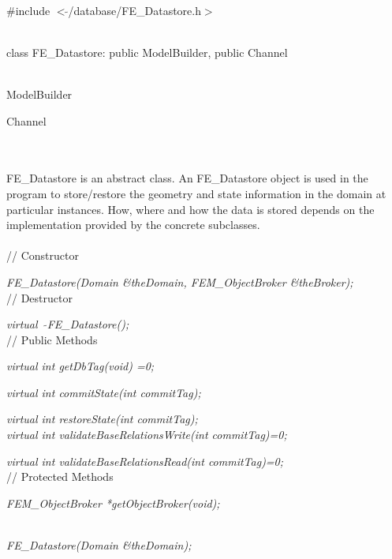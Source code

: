 
   \\
\#include $<\tilde{ }$/database/FE\_Datastore.h$>$  


  \\
class FE\_Datastore: public ModelBuilder, public Channel 


 \\
ModelBuilder 

Channel 

\indent{} \\

  \\
\indent FE\_Datastore is an abstract class. An FE\_Datastore object is
used in the program to store/restore the geometry and state information 
in the domain at particular instances. How, where and how the data is
stored depends on the implementation provided by the concrete
subclasses. \\  

 \\
// Constructor 

{\em FE\_Datastore(Domain \&theDomain, FEM\_ObjectBroker \&theBroker);}\\ 

// Destructor 

{\em virtual~ $\tilde{}$FE\_Datastore();}\\ 

// Public Methods  

{\em virtual int getDbTag(void) =0;}

{\em virtual int commitState(int commitTag);}

{\em virtual int restoreState(int commitTag);}\\

{\em virtual int validateBaseRelationsWrite(int commitTag)=0;}

{\em virtual int validateBaseRelationsRead(int commitTag)=0;}\\ 

// Protected Methods  

{\em FEM\_ObjectBroker *getObjectBroker(void);}


  \\
{\em FE\_Datastore(Domain \&theDomain);}  \\ 

